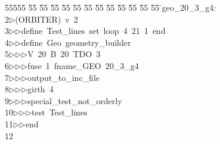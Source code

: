 %
%
\begin{tabbing}
55555 \= 55 \= 55 \= 55 \= 55 \= 55 \= 55 \= 55 \= 55 \= 55 \= 55 \= 55 \= 55 \= \>geo\_20\_3\_g4:\\[0pt]
2\>$\triangleright$\>(ORBITER)\ v\ 2\ \\[0pt]
3\>$\triangleright$\>$\triangleright$\>define\ Test\_lines\ set\ loop\ 4\ 21\ 1\ end\ \\[0pt]
4\>$\triangleright$\>$\triangleright$\>define\ Geo\ geometry\_builder\ \\[0pt]
5\>$\triangleright$\>$\triangleright$\>$\triangleright$\>V\ 20\ B\ 20\ TDO\ 3\ \\[0pt]
6\>$\triangleright$\>$\triangleright$\>$\triangleright$\>fuse\ 1\ fname\_GEO\ 20\_3\_g4\ \\[0pt]
7\>$\triangleright$\>$\triangleright$\>$\triangleright$\>output\_to\_inc\_file\ \\[0pt]
8\>$\triangleright$\>$\triangleright$\>$\triangleright$\>girth\ 4\ \\[0pt]
9\>$\triangleright$\>$\triangleright$\>$\triangleright$\>special\_test\_not\_orderly\ \\[0pt]
10\>$\triangleright$\>$\triangleright$\>$\triangleright$\>test\ Test\_lines\ \\[0pt]
11\>$\triangleright$\>$\triangleright$\>end\\[0pt]
12\>\end{tabbing}

